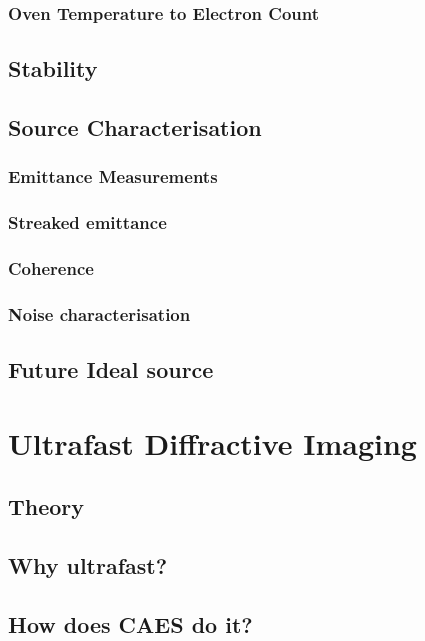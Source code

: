 \subsection{Oven Temperature to Electron Count}

\section{Stability}

\section{Source Characterisation}

\subsection{Emittance Measurements}

\subsection{Streaked emittance}

\subsection{Coherence}

\subsection{Noise characterisation}

\section{Future Ideal source}


\chapter{Ultrafast Diffractive Imaging}

\section{Theory}

\section{Why ultrafast?}

\section{How does CAES do it?}

